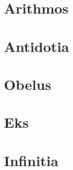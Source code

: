 \documentclass[letterpaper,12pt]{article}
\begin{document}
	\section{Arithmos}
	\section{Antidotia}
	\section{Obelus}
	\section{Eks}
	\section{Infinitia}
\end{document}
